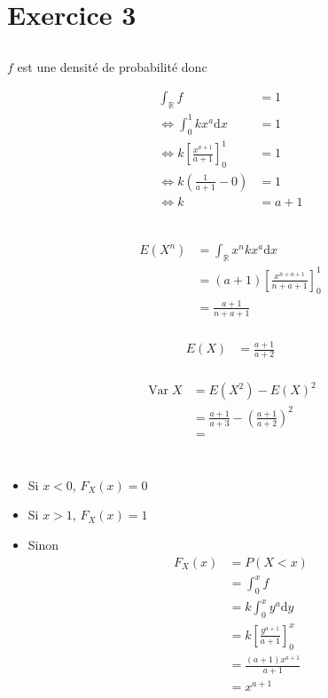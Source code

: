 \documentclass{article}
\newcommand{\R}{\mathbb{R}}
\newcommand{\dx}{\mathrm{d}x}
\newcommand{\dy}{\mathrm{d}y}
\newcommand{\var}{\operatorname{Var}}
\begin{document}
\setcounter{section}{2}
\section{Exercice 3}

\subsection{}

$f$ est une densité de probabilité donc

\begin{align*}
	\int_{\R} f &= 1 \\
	\iff \int_0^1 kx^a \dx &= 1 \\
	\iff k\left[ \frac{x^{a+1}}{a+1}  \right]_0^1 &= 1 \\
	\iff k(\frac{1}{a+1} - 0) &= 1 \\
	\iff k &=  a+1 \\
\end{align*}

\subsection{}

\begin{align*}
	E(X^n) &= \int_{\R} x^n kx^a \dx \\
	       &= (a+1) \left[ \frac{x^{n+a+1}}{n+a+1} \right]_0^1 \\
	       &= \frac{a+1}{n+a+1} \\
\end{align*}

\begin{align*}
	E(X) &= \frac{a+1}{a+2} \\
\end{align*}

\begin{align*}
	\var X &= E(X^2) - E(X)^2 \\
	       &= \frac{a+1}{a+3} - \left(\frac{a+1}{a+2}\right)^2 \\
	       &= \frac{}{} \\
\end{align*}

\subsection{}

\begin{itemize}
	\item Si $x<0$,  $F_X(x) = 0$
	\item Si $x>1$, $F_X(x) = 1$
	\item Sinon 
\begin{align*}
	F_X(x) &=   P(X<x) \\
	&=  \int_0^x f \\
	&=  k \int_0^x y^a \dy \\
	&=  k \left[ \frac{y^{a+1}}{a+1} \right]_0^x \\
	&=  \frac{(a+1)x^{a+1}}{a+1} \\
	&= x^{a+1} \\
\end{align*}
\end{itemize}
\end{document}
